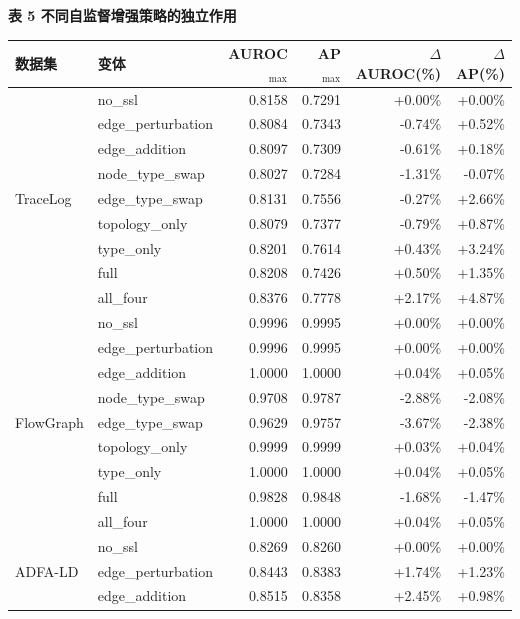 \begin{table}[t]
\centering
\textbf{表 5 不同自监督增强策略的独立作用}\par\vspace{3pt}
\scriptsize
\renewcommand{\arraystretch}{0.98}
\setlength{\tabcolsep}{4pt}
\begin{tabular}{llrrrr}
\toprule
数据集 & 变体 & AUROC$_{\max}$ & AP$_{\max}$ & $\Delta$AUROC(\%) & $\Delta$AP(\%) \\
\midrule
\multirow{9}{*}{TraceLog} & no\_ssl & 0.8158 & 0.7291 & +0.00\% & +0.00\% \\
 & edge\_perturbation & 0.8084 & 0.7343 & -0.74\% & +0.52\% \\
 & edge\_addition & 0.8097 & 0.7309 & -0.61\% & +0.18\% \\
 & node\_type\_swap & 0.8027 & 0.7284 & -1.31\% & -0.07\% \\
 & edge\_type\_swap & 0.8131 & 0.7556 & -0.27\% & +2.66\% \\
 & topology\_only & 0.8079 & 0.7377 & -0.79\% & +0.87\% \\
 & type\_only & 0.8201 & 0.7614 & +0.43\% & +3.24\% \\
 & full & 0.8208 & 0.7426 & +0.50\% & +1.35\% \\
 & all\_four & 0.8376 & 0.7778 & +2.17\% & +4.87\% \\
\midrule
\multirow{9}{*}{FlowGraph} & no\_ssl & 0.9996 & 0.9995 & +0.00\% & +0.00\% \\
 & edge\_perturbation & 0.9996 & 0.9995 & +0.00\% & +0.00\% \\
 & edge\_addition & 1.0000 & 1.0000 & +0.04\% & +0.05\% \\
 & node\_type\_swap & 0.9708 & 0.9787 & -2.88\% & -2.08\% \\
 & edge\_type\_swap & 0.9629 & 0.9757 & -3.67\% & -2.38\% \\
 & topology\_only & 0.9999 & 0.9999 & +0.03\% & +0.04\% \\
 & type\_only & 1.0000 & 1.0000 & +0.04\% & +0.05\% \\
 & full & 0.9828 & 0.9848 & -1.68\% & -1.47\% \\
 & all\_four & 1.0000 & 1.0000 & +0.04\% & +0.05\% \\
\midrule
\multirow{9}{*}{ADFA-LD} & no\_ssl & 0.8269 & 0.8260 & +0.00\% & +0.00\% \\
 & edge\_perturbation & 0.8443 & 0.8383 & +1.74\% & +1.23\% \\
 & edge\_addition & 0.8515 & 0.8358 & +2.45\% & +0.98\% \\

\end{tabular}
\end{table}

